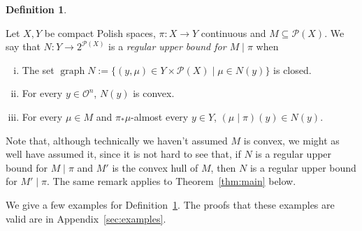 \documentclass[aop,preprint]{imsart}
\numberwithin{equation}{section}
\theoremstyle{definition}
\newtheorem{definition}{Definition}[section]
\theoremstyle{plain}
\DeclareMathOperator{\Gr}{graph}
\newcommand{\PM}{\mathcal{P}}
\newcommand{\Ob}{\mathcal{O}}
\begin{document}
\begin{samepage}
\begin{definition}
\label{def:update_incomplete}

Let $X,Y$ be compact Polish spaces, $\pi: X \rightarrow Y$ continuous and $M \subseteq \PM(X)$. We say that $N: Y \rightarrow 2^{\PM(X)}$ is a \emph{regular upper bound for $M \mid \pi$} when 
%
\begin{enumerate}[i.]
\item\label{con:def__update_incomplete__clos} The set $\Gr{N}:=\{(y,\mu)\in Y\times\PM(X) \mid \mu \in N(y)\}$ is closed.
\item\label{con:def__update_incomplete__conv} For every $y \in \Ob^n$, $N(y)$ is convex.
\item\label{con:def__update_incomplete__cond} For every $\mu \in M$ and $\pi_*\mu$-almost every $y \in Y$, $(\mu \mid \pi)(y) \in N(y)$.
\end{enumerate}

\end{definition}
\end{samepage}

Note that, although technically we haven't assumed $M$ is convex, we might as well have assumed it, since it is not hard to see that, if $N$ is a regular upper bound for $M \mid \pi$ and $M'$ is the convex hull of $M$, then $N$ is a regular upper bound for $M' \mid \pi$. The same remark applies to Theorem~\ref{thm:main} below.

We give a few examples for Definition~\ref{def:update_incomplete}. The proofs that these examples are valid are in Appendix~\ref{sec:examples}.
\end{document}

